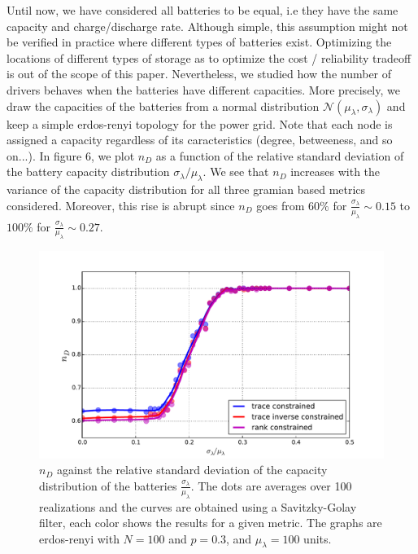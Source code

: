 \documentclass[conference]{IEEEtran}
\begin{document}
Until now, we have considered all batteries to be equal, i.e they have the same capacity and charge/discharge rate. Although simple, this assumption might not be verified in practice where different types of batteries exist. Optimizing the locations of different types of storage as to optimize the cost / reliability tradeoff is out of the scope of this paper. Nevertheless, we studied how the number of drivers behaves when the batteries have different capacities. More precisely, we draw the capacities of the batteries from a normal distribution $ \mathcal{N}( \mu_{\lambda}, \sigma_{\lambda} ) $ and keep a simple erdos-renyi topology for the power grid. Note that each node is assigned a capacity regardless of its caracteristics (degree, betweeness, and so on...). In figure 6, we plot $n_D$ as a function of the relative standard deviation of the battery capacity distribution $ \sigma_{\lambda} / \mu_{\lambda} $. We see that $n_D$ increases with the variance of the capacity distribution for all three gramian based metrics considered. Moreover, this rise is abrupt since $n_D$ goes from $ 60 \%$ for $\frac{\sigma_{\lambda}}{\mu_{\lambda}} \sim 0.15 $ to $100 \% $ for $\frac{\sigma_{\lambda}}{\mu_{\lambda}} \sim 0.27 $. 

\begin{figure}
\includegraphics[scale=.37]{./figure_7/figure_7}
\caption{$n_D$ against the relative standard deviation of the capacity distribution of the batteries $ \frac{ \sigma_{ \lambda } }{ \mu_{ \lambda} } $. The dots are averages over 100 realizations and the curves are obtained using a Savitzky-Golay filter, each color shows the results for a given metric. The graphs are erdos-renyi with $N=100$ and $p=0.3$, and $\mu_{\lambda} = 100 $ units. }
\label{fig:batteries_variance}
\end{figure} 
\end{document}
